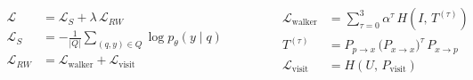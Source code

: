 \documentclass[border=4pt]{standalone}
\begin{document}
\color{ink}
$\displaystyle
\begin{aligned}
\mathcal{L} &= \mathcal{L}_{S} + \lambda\,\mathcal{L}_{RW}\\[14pt]
\mathcal{L}_{S} &= -\frac{1}{|Q|}\sum_{(q,y)\in Q}\log p_\theta(y\mid q)\\[14pt]
\mathcal{L}_{RW} &= \mathcal{L}_{\text{walker}} + \mathcal{L}_{\text{visit}}
\end{aligned}
\qquad\qquad
\begin{aligned}
\mathcal{L}_{\text{walker}} &= \sum_{\tau=0}^{3}\alpha^{\tau}\,H\!\left(I,\,T^{(\tau)}\right)\\[10pt]
T^{(\tau)} &= P_{p\to x}\,\big(P_{x\to x}\big)^{\tau}\,P_{x\to p}\\[10pt]
\mathcal{L}_{\text{visit}} &= H\!\left(U,\,P_{\text{visit}}\right)
\end{aligned}$
\end{document}
